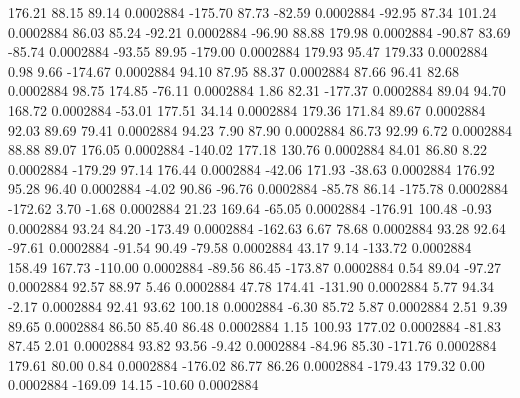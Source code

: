       176.21       88.15       89.14     0.0002884
     -175.70       87.73      -82.59     0.0002884
      -92.95       87.34      101.24     0.0002884
       86.03       85.24      -92.21     0.0002884
      -96.90       88.88      179.98     0.0002884
      -90.87       83.69      -85.74     0.0002884
      -93.55       89.95     -179.00     0.0002884
      179.93       95.47      179.33     0.0002884
        0.98        9.66     -174.67     0.0002884
       94.10       87.95       88.37     0.0002884
       87.66       96.41       82.68     0.0002884
       98.75      174.85      -76.11     0.0002884
        1.86       82.31     -177.37     0.0002884
       89.04       94.70      168.72     0.0002884
      -53.01      177.51       34.14     0.0002884
      179.36      171.84       89.67     0.0002884
       92.03       89.69       79.41     0.0002884
       94.23        7.90       87.90     0.0002884
       86.73       92.99        6.72     0.0002884
       88.88       89.07      176.05     0.0002884
     -140.02      177.18      130.76     0.0002884
       84.01       86.80        8.22     0.0002884
     -179.29       97.14      176.44     0.0002884
      -42.06      171.93      -38.63     0.0002884
      176.92       95.28       96.40     0.0002884
       -4.02       90.86      -96.76     0.0002884
      -85.78       86.14     -175.78     0.0002884
     -172.62        3.70       -1.68     0.0002884
       21.23      169.64      -65.05     0.0002884
     -176.91      100.48       -0.93     0.0002884
       93.24       84.20     -173.49     0.0002884
     -162.63        6.67       78.68     0.0002884
       93.28       92.64      -97.61     0.0002884
      -91.54       90.49      -79.58     0.0002884
       43.17        9.14     -133.72     0.0002884
      158.49      167.73     -110.00     0.0002884
      -89.56       86.45     -173.87     0.0002884
        0.54       89.04      -97.27     0.0002884
       92.57       88.97        5.46     0.0002884
       47.78      174.41     -131.90     0.0002884
        5.77       94.34       -2.17     0.0002884
       92.41       93.62      100.18     0.0002884
       -6.30       85.72        5.87     0.0002884
        2.51        9.39       89.65     0.0002884
       86.50       85.40       86.48     0.0002884
        1.15      100.93      177.02     0.0002884
      -81.83       87.45        2.01     0.0002884
       93.82       93.56       -9.42     0.0002884
      -84.96       85.30     -171.76     0.0002884
      179.61       80.00        0.84     0.0002884
     -176.02       86.77       86.26     0.0002884
     -179.43      179.32        0.00     0.0002884
     -169.09       14.15      -10.60     0.0002884
